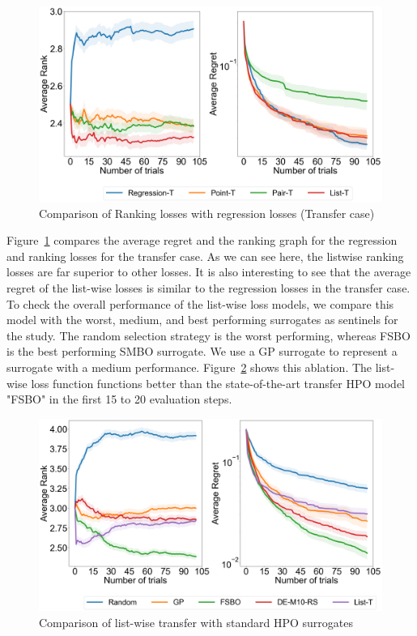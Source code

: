 \documentclass[12pt, twoside, ngerman]{report}
\begin{document}
\begin{figure}[h]
  \centering
    \includegraphics[scale=0.25]{images/Q1AblationTransfer}
    \caption{Comparison of Ranking losses with regression losses (Transfer case)}
    \label{fig:Q1AblationTransfer}
\end{figure}

Figure~\ref{fig:Q1AblationTransfer} compares the average regret and the ranking graph for the regression and ranking losses for the transfer case.
As we can see here,  the listwise ranking losses are far superior to other losses.
It is also interesting to see that the average regret of the list-wise losses is similar to the regression losses in the transfer case.
To check the overall performance of the list-wise loss models, we compare this model with the worst,  medium, and best performing surrogates as sentinels for the study.
The random selection strategy is the worst performing,  whereas FSBO is the best performing SMBO surrogate. We use a GP surrogate to represent a surrogate with a medium performance.
Figure~\ref{fig:Q1FinalAblation} shows this ablation.
The list-wise loss function functions better than the state-of-the-art transfer HPO model "FSBO" in the first 15 to 20 evaluation steps.

\begin{figure}[h]
  \centering
    \includegraphics[scale=0.25]{images/Q1FinalAblation}
    \caption{Comparison of list-wise transfer with standard HPO surrogates}
    \label{fig:Q1FinalAblation}
\end{figure}
\end{document}
